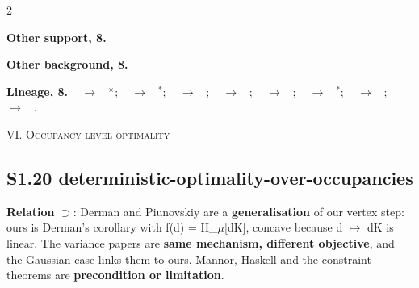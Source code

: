 \documentclass[10pt]{article}
\newcommand{\memb}[1]{\par\smallskip\textbf{#1}\quad}
\begin{document}
\begin{multicols}{2}
\memb{Other support, 8.} \citetext{\citealp{Jacobson-optimal73}; \citealp{Whittle-risk81}; \citealp{Glover-state88}; \citealp{Mustafa-minimum90}\dag; \citealp{Dai-connections96}; \citealp{Petersen-minimax00}; \citealp{Won-cost04}\dag; \citealp{Nagengast-risk10}}

\memb{Other background, 8.} {\footnotesize \citetext{\citealp{Sain-performance71}; \citealp{Glover-derivation89}; \citealp{Mustafa-relations89}; \citealp{Iglesias-discrete90}; \citealp{Runolfsson-stationary90}; \citealp{Whittle-risk90b}; \citealp{Fleming-risk95}; \citealp{Hansen-robust06}}}

\end{multicols}
\memb{Lineage, 8.} {\footnotesize \citeauthor{Howard-risksensitive72}~\citeyear{Howard-risksensitive72} $\to$ \citeauthor{Jacobson-optimal73}~\citeyear{Jacobson-optimal73}$^\times$; \citeauthor{Jacobson-optimal73}~\citeyear{Jacobson-optimal73} $\to$ \citeauthor{Whittle-risk81}~\citeyear{Whittle-risk81}$^\ast$; \citeauthor{Jacobson-optimal73}~\citeyear{Jacobson-optimal73} $\to$ \citeauthor{Dai-connections96}~\citeyear{Dai-connections96}; \citeauthor{Whittle-risk81}~\citeyear{Whittle-risk81} $\to$ \citeauthor{Dai-connections96}~\citeyear{Dai-connections96}; \citeauthor{Whittle-risk81}~\citeyear{Whittle-risk81} $\to$ \citeauthor{Nagengast-risk10}~\citeyear{Nagengast-risk10}; \citeauthor{Glover-state88}~\citeyear{Glover-state88} $\to$ \citeauthor{Mustafa-minimum90}~\citeyear{Mustafa-minimum90}$^\ast$; \citeauthor{Glover-state88}~\citeyear{Glover-state88} $\to$ \citeauthor{Iglesias-tradeoffs01}~\citeyear{Iglesias-tradeoffs01}; \citeauthor{Mustafa-minimum90}~\citeyear{Mustafa-minimum90} $\to$ \citeauthor{Iglesias-tradeoffs01}~\citeyear{Iglesias-tradeoffs01}.}

\medskip\textsc{VI. Occupancy-level optimality}

\subsection{S1.20 deterministic-optimality-over-occupancies}\label{node:S1-S1-20-deterministic-optimality-over-occupancies}
\textbf{Relation} $\supset$: Derman and Piunovskiy are a \textbf{generalisation} of our vertex step: ours is Derman's corollary with f(d) = H\_\ensuremath{\mu}[dK], concave because d \ensuremath{\mapsto} dK is linear. The variance papers are \textbf{same mechanism, different objective}, and the Gaussian case links them to ours. Mannor, Haskell and the constraint theorems are \textbf{precondition or limitation}.
\end{document}
